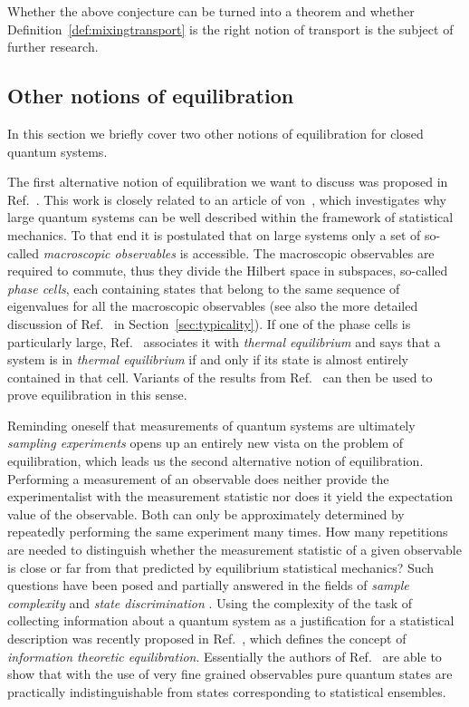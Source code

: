 \documentclass[a4paper,12pt,listof=totoc,index=totoc,bibliography=totoc,headsepline=false,headings=normal,BCOR16.153846mm,DIV12,headinclude,twoside,cleardoublepage=empty,numbers=noenddot,final]{scrreprt}
\theoremstyle{mystyle}
\numberwithin{equation}{section}
\numberwithin{figure}{section}
\numberwithin{lemma}{section}
\numberwithin{theorem}{section}
\numberwithin{corollary}{section}
\numberwithin{definition}{section}
\numberwithin{conjecture}{section}
\numberwithin{observation}{section}
\newcommand{\+}{\mkern2mu}
\DeclareMathOperator{\1}{\mathds{1}}
\begin{document}
Whether the above conjecture can be turned into a theorem and whether Definition~\ref{def:mixingtransport} is the right notion of transport is the subject of further research.


\subsection{Other notions of equilibration}
\label{sec:othernotionsofequilibration}
%
In this section we briefly cover two other notions of equilibration for closed quantum systems.

The first alternative notion of equilibration we want to discuss was proposed in Ref.~\cite{0907.0108v1}.
This work is closely related to an article of von~\textcite{vonneumann1929}, which investigates why large quantum systems can be well described within the framework of statistical mechanics.
To that end it is postulated that on large systems only a set of so-called \emph{macroscopic observables} is accessible.
The macroscopic observables are required to commute, thus they divide the Hilbert space in subspaces, so-called \emph{phase cells}, each containing states that belong to the same sequence of eigenvalues for all the macroscopic observables (see also the more detailed discussion of Ref.~\cite{vonneumann1929} in Section~\ref{sec:typicality}).
If one of the phase cells is particularly large, Ref.~\cite{0907.0108v1} associates it with \emph{thermal equilibrium} and says that a system is in \emph{thermal equilibrium} if and only if its state is almost entirely contained in that cell.
Variants of the results from Ref.~\cite{vonneumann1929} can then be used to prove equilibration in this sense.

Reminding oneself that measurements of quantum systems are ultimately \emph{sampling experiments} opens up an entirely new vista on the problem of equilibration, which leads us the second alternative notion of equilibration.
Performing a measurement of an observable does neither provide the experimentalist with the measurement statistic nor does it yield the expectation value of the observable.
Both can only be approximately determined by repeatedly performing the same experiment many times.
How many repetitions are needed to distinguish whether the measurement statistic of a given observable is close or far from that predicted by equilibrium statistical mechanics?
Such questions have been posed and partially answered in the fields of \emph{sample complexity} \cite{Batu2001,Batu2000,Canonne2012} and \emph{state discrimination} \cite{Audenaert2012,Audenaert2012a}.
Using the complexity of the task of collecting information about a quantum system as a justification for a statistical description was recently proposed in Ref.~\cite{Ududec2012}, which defines the concept of \emph{information theoretic equilibration}.
Essentially the authors of Ref.~\cite{Ududec2012} are able to show that with the use of very fine grained observables pure quantum states are practically indistinguishable from states corresponding to statistical ensembles.
\end{document}

